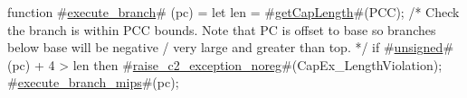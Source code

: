 function #\hyperref[zexecutezybranch]{execute\_branch}# (pc) = {
  let len = #\hyperref[zgetCapLength]{getCapLength}#(PCC);
  /* Check the branch is within PCC bounds. Note that PC is offset to
  base so branches below base will be negative / very large and
  greater than top. */
  if #\hyperref[zunsigned]{unsigned}#(pc) + 4 > len then
    #\hyperref[zraisezyc2zyexceptionzynoreg]{raise\_c2\_exception\_noreg}#(CapEx_LengthViolation);
  #\hyperref[zexecutezybranchzymips]{execute\_branch\_mips}#(pc); }
